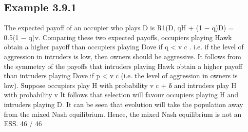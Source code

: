 \documentclass[]{report}
\begin{document}
\subsection{Example 3.9.1}
The expected payoff of an occupier who plays D is
R1(D, qH + (1 − q)D) = 0.5(1 − q)v.
Comparing these two expected payoffs, occupiers playing Hawk
obtain a higher payoff than occupiers playing Dove if q <
v
c
.
i.e. if the level of aggression in intruders is low, then owners should
be aggressive.
It follows from the symmetry of the payoffs that intruders playing
Hawk obtain a higher payoff than intruders playing Dove if p <
v
c
(i.e. the level of aggression in owners is low).
Suppose occupiers play H with probability v
c + δ and intruders play
H with probability v
It follows that selection will favour occupiers playing H and
intruders playing D.
It can be seen that evolution will take the population away from
the mixed Nash equilibrium. Hence, the mixed Nash equilibrium is
not an ESS.
46 / 46
\end{document}
